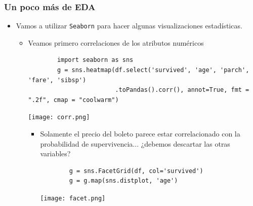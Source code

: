 \documentclass[leqno, 10pt, envcountsect]{beamer}
\numberwithin{equation}{section}
\theoremstyle{definition}
\theoremstyle{example}
\numberwithin{figure}{section}
\numberwithin{table}{section}
\let\olditem\item
\renewcommand{\item}{%
\olditem\vspace{1pt}}
\begin{document}
\begin{frame}[fragile=singleslide]
  \frametitle{Un poco más de EDA}
  \begin{itemize}
    \item Vamos a utilizar \texttt{Seaborn} para hacer algunas visualizaciones
      estadísticas.
      \begin{itemize}
        \item Veamos primero correlaciones de los atributos numéricos
        \begin{verbatim}
        import seaborn as sns
        g = sns.heatmap(df.select('survived', 'age', 'parch', 'fare', 'sibsp')
                        .toPandas().corr(), annot=True, fmt = ".2f", cmap = "coolwarm")
        \end{verbatim}
        \begin{center}
          \texttt{[image: corr.png]}
        \end{center}
        \begin{itemize}
          \item Solamente el precio del boleto parece estar correlacionado con
            la probabilidad de supervivencia... ¿debemos descartar las otras
            variables?
        \begin{verbatim}
        g = sns.FacetGrid(df, col='survived')
        g = g.map(sns.distplot, 'age')
        \end{verbatim}
        \begin{center}
          \texttt{[image: facet.png]}
        \end{center}
        \end{itemize}
      \end{itemize}
  \end{itemize}
\end{frame}
\end{document}
